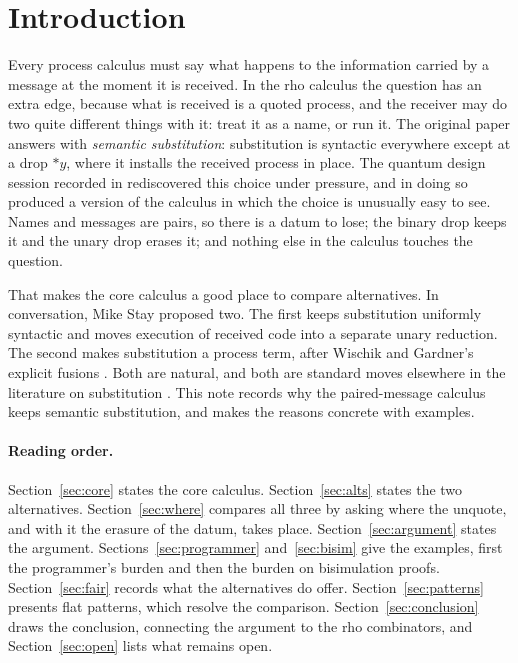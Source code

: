 \documentclass[11pt,a4paper]{article}
\theoremstyle{plain}
\theoremstyle{definition}
\theoremstyle{remark}
\newcommand{\rhoc}{\textsf{rho}}
\newcommand{\drop}[1]{{*}#1}
\begin{document}
\tableofcontents

\section{Introduction}

Every process calculus must say what happens to the information carried by a
message at the moment it is received. In the \rhoc{} calculus \cite{MR05} the
question has an extra edge, because what is received is a quoted process, and
the receiver may do two quite different things with it: treat it as a name, or
run it. The original paper answers with \emph{semantic substitution}:
substitution is syntactic everywhere except at a drop $\drop{y}$, where it
installs the received process in place. The quantum design session recorded in
\cite{UE} rediscovered this choice under pressure, and in doing so produced a
version of the calculus in which the choice is unusually easy to see. Names
and messages are pairs, so there is a datum to lose; the binary drop keeps it
and the unary drop erases it; and nothing else in the calculus touches the
question.

That makes the core calculus a good place to compare alternatives. In
conversation, Mike Stay proposed two. The first keeps substitution uniformly
syntactic and moves execution of received code into a separate unary
reduction. The second makes substitution a process term, after Wischik and
Gardner's explicit fusions \cite{GW00}. Both are natural, and both are standard
moves elsewhere in the literature on substitution \cite{ACCL91}. This note
records why the paired-message calculus keeps semantic substitution, and makes
the reasons concrete with examples.

\paragraph{Reading order.} Section~\ref{sec:core} states the core calculus.
Section~\ref{sec:alts} states the two alternatives. Section~\ref{sec:where}
compares all three by asking where the unquote, and with it the erasure of the
datum, takes place. Section~\ref{sec:argument} states the argument.
Sections~\ref{sec:programmer} and~\ref{sec:bisim} give the examples, first the
programmer's burden and then the burden on bisimulation proofs.
Section~\ref{sec:fair} records what the alternatives do offer.
Section~\ref{sec:patterns} presents flat patterns, which resolve the
comparison. Section~\ref{sec:conclusion} draws the conclusion, connecting the argument
to the rho combinators, and Section~\ref{sec:open} lists what remains open.
\end{document}
